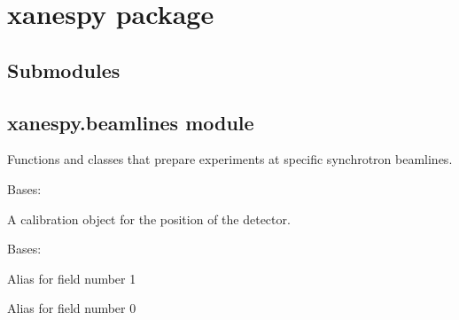 \documentclass[letterpaper,10pt,english]{sphinxmanual}
\begin{document}
\section{xanespy package}
\label{\detokenize{xanespy:xanespy-package}}\label{\detokenize{xanespy::doc}}

\subsection{Submodules}
\label{\detokenize{xanespy:submodules}}

\subsection{xanespy.beamlines module}
\label{\detokenize{xanespy:xanespy-beamlines-module}}\label{\detokenize{xanespy:module-xanespy.beamlines}}
Functions and classes that prepare experiments at specific
synchrotron beamlines.

\begin{fulllineitems}
\label{\detokenize{xanespy:xanespy.beamlines.Detector}}
Bases: {\hyperref[\detokenize{xanespy:xanespy.beamlines.Zoneplate}]{}}

A calibration object for the position of the detector.

\end{fulllineitems}


\begin{fulllineitems}
\label{\detokenize{xanespy:xanespy.beamlines.DetectorPoint}}
Bases: 

\begin{fulllineitems}
\label{\detokenize{xanespy:xanespy.beamlines.DetectorPoint.energy}}
Alias for field number 1

\end{fulllineitems}


\begin{fulllineitems}
\label{\detokenize{xanespy:xanespy.beamlines.DetectorPoint.z}}
Alias for field number 0

\end{fulllineitems}


\end{fulllineitems}
\end{document}
